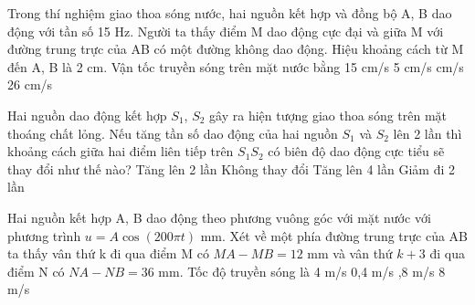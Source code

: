 \begin{vidu}%
Trong thí nghiệm giao thoa sóng nước, hai nguồn kết hợp và đồng bộ A, B dao động với tần số 15 Hz. Người ta thấy điểm M dao động cực đại và giữa M với đường trung trực của AB có một đường không dao động. Hiệu khoảng cách từ M đến A, B là 2 cm. Vận tốc truyền sóng trên mặt nước bằng
\choice
{15 cm/s}
{5 cm/s}
{ cm/s}
{26 cm/s}
\end{vidu} %
\begin{vidu}%
Hai nguồn dao động kết hợp $S_1$, $S_2$ gây ra hiện tượng giao thoa sóng trên mặt thoáng chất lỏng. Nếu tăng tần số dao động của hai nguồn $S_1$ và $S_2$ lên 2 lần thì khoảng cách giữa hai điểm liên tiếp trên $S_1S_2$ có biên độ dao động cực tiểu sẽ thay đổi như thế nào?
\choice
{Tăng lên 2 lần}
{Không thay đổi}
{Tăng lên 4 lần}
{\True Giảm đi 2 lần}
\end{vidu} %
\begin{vidu}%
Hai nguồn kết hợp A, B dao động theo phương vuông góc với mặt nước với phương trình $u=A\cos(200\pi t)$ mm. Xét về một phía đường trung trực của AB ta thấy vân thứ k đi qua điểm M có $MA-MB=12$ mm và vân thứ $k+3$ đi qua điểm N có $NA - NB=36$ mm. Tốc độ truyền sóng là
\choice
{4 m/s}
{0,4 m/s}
{,8 m/s}
{8 m/s}
\end{vidu} %

